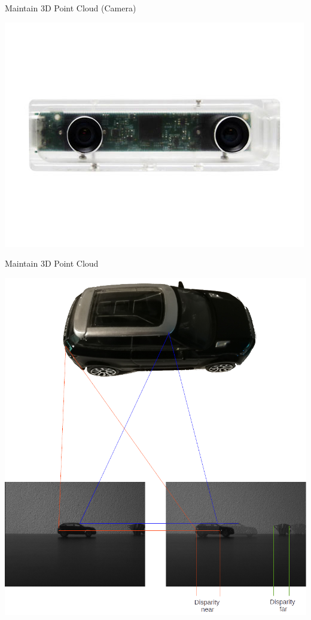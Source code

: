 \documentclass[aspectratio=169]{beamer}
\begin{document}
\begin{frame}{Maintain 3D Point Cloud (Camera)}
  \begin{center}
    \includegraphics[height=0.9\textheight]{../img/tara_cam.jpg}
  \end{center}
\end{frame}


\begin{frame}{Maintain 3D Point Cloud}
  \begin{center}
    \includegraphics[height=0.9\textheight]{../img/disparity_concept.png}
  \end{center}
\end{frame}
\end{document}
